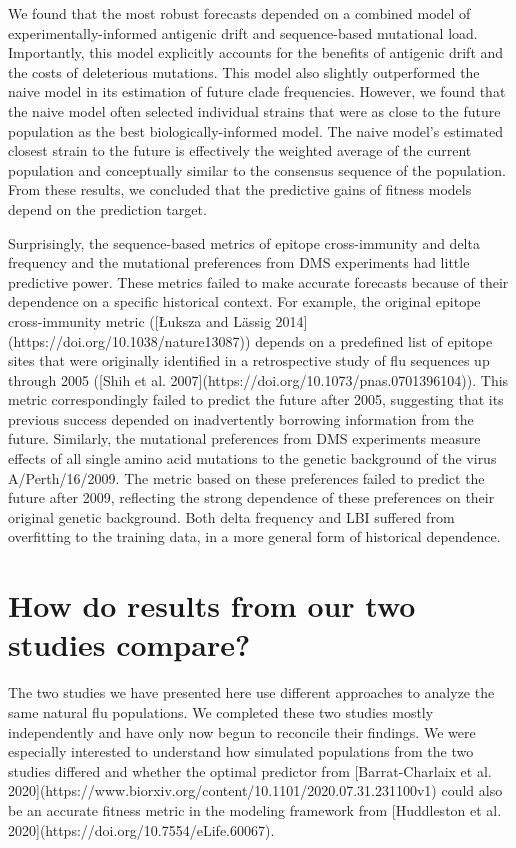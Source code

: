 We found that the most robust forecasts depended on a combined model of experimentally-informed antigenic drift and sequence-based mutational load.
Importantly, this model explicitly accounts for the benefits of antigenic drift and the costs of deleterious mutations.
This model also slightly outperformed the naive model in its estimation of future clade frequencies.
However, we found that the naive model often selected individual strains that were as close to the future population as the best biologically-informed model.
The naive model's estimated closest strain to the future is effectively the weighted average of the current population and conceptually similar to the consensus sequence of the population.
From these results, we concluded that the predictive gains of fitness models depend on the prediction target.

Surprisingly, the sequence-based metrics of epitope cross-immunity and delta frequency and the mutational preferences from DMS experiments had little predictive power.
These metrics failed to make accurate forecasts because of their dependence on a specific historical context.
For example, the original epitope cross-immunity metric ([Łuksza and Lässig 2014](https://doi.org/10.1038/nature13087)) depends on a predefined list of epitope sites that were originally identified in a retrospective study of flu sequences up through 2005 ([Shih et al. 2007](https://doi.org/10.1073/pnas.0701396104)).
This metric correspondingly failed to predict the future after 2005, suggesting that its previous success depended on inadvertently borrowing information from the future.
Similarly, the mutational preferences from DMS experiments measure effects of all single amino acid mutations to the genetic background of the virus A/Perth/16/2009.
The metric based on these preferences failed to predict the future after 2009, reflecting the strong dependence of these preferences on their original genetic background.
Both delta frequency and LBI suffered from overfitting to the training data, in a more general form of historical dependence.

\section{How do results from our two studies compare?}

The two studies we have presented here use different approaches to analyze the same natural flu populations.
We completed these two studies mostly independently and have only now begun to reconcile their findings.
We were especially interested to understand how simulated populations from the two studies differed and whether the optimal predictor from [Barrat-Charlaix et al. 2020](https://www.biorxiv.org/content/10.1101/2020.07.31.231100v1) could also be an accurate fitness metric in the modeling framework from [Huddleston et al. 2020](https://doi.org/10.7554/eLife.60067).


